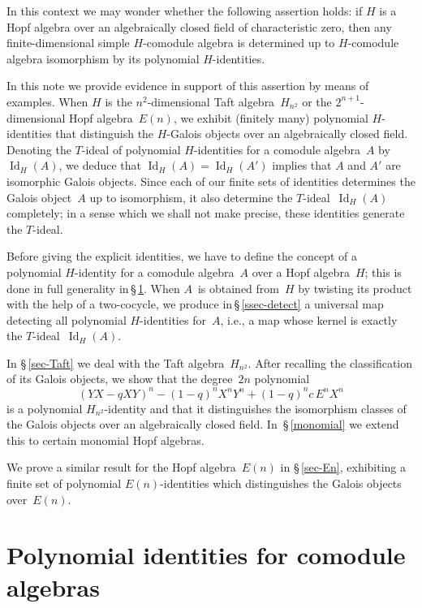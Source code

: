 \documentclass[11pt, a4paper]{amsart}
\theoremstyle{definition}
\numberwithin{equation}{section}
\begin{document}
In this context we may wonder whether the following assertion holds: 
if $H$ is a Hopf algebra over an algebraically closed field of characteristic zero,
then any finite-dimensional simple $H$-comodule algebra is determined 
up to $H$-comodule algebra isomorphism by its polynomial $H$-identities.

In this note we provide evidence in support of this assertion by means of examples.
When $H$ is the $n^2$-dimensional Taft algebra~$H_{n^2}$ or 
the $2^{n+1}$-dimensional Hopf algebra~$E(n)$, we exhibit (finitely many) polynomial $H$-identities
that distinguish the $H$-Galois objects over an algebraically closed field.
Denoting the $T$-ideal of polynomial $H$-identities for a comodule algebra~$A$ by~$\operatorname{Id}_H(A)$,
we deduce that $\operatorname{Id}_H(A) = \operatorname{Id}_H(A')$ implies that $A$ and $A'$ are isomorphic Galois objects.
Since each of our finite sets of identities determines the Galois object~$A$ up to isomorphism, it
also determine the $T$-ideal~$\operatorname{Id}_H(A)$ completely;
in a sense which we shall not make precise, these identities generate the $T$-ideal.

Before giving the explicit identities, we have to 
define the concept of a polynomial $H$-identity for a comodule algebra~$A$
over a Hopf algebra~$H$; this is done in full generality in\,\S\,\ref{sec-PI}.
When $A$~is obtained from~$H$ by twisting its product with the help of a two-cocycle,
we produce in\,\S\,\ref{ssec-detect} a universal map detecting all polynomial $H$-identities for~$A$, i.e., 
a map whose kernel is exactly the $T$-ideal~$\operatorname{Id}_H(A)$. 

In \S\,\ref{sec-Taft} we deal with the Taft algebra~$H_{n^2}$.
After recalling the classification of its Galois objects, we show that the degree~$2n$ polynomial 
\begin{equation*}
(YX - qXY)^n - (1-q)^n X^nY^n + (1-q)^n c \, E^nX^n
\end{equation*}
is a polynomial $H_{n^2}$-identity  and that
it distinguishes the isomorphism classes of the Galois objects over an algebraically closed field. 
In~\S\,\ref{monomial} we extend this to certain monomial Hopf algebras.

We prove a similar result for the Hopf algebra~$E(n)$ in \S\,\ref{sec-En}, 
exhibiting a finite set of polynomial $E(n)$-identities which distinguishes the Galois objects over~$E(n)$.

\section{Polynomial identities for comodule algebras}\label{sec-PI}
\end{document}
